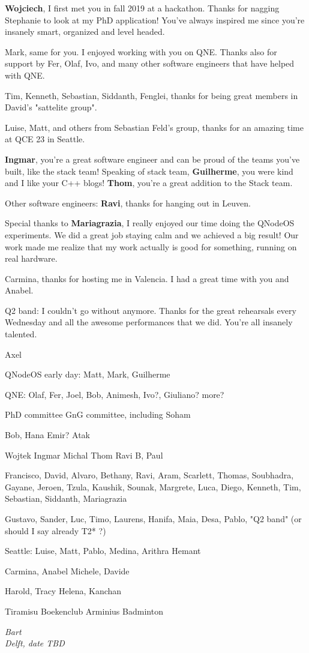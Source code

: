\textbf{Wojciech}, I first met you in fall 2019 at a hackathon. Thanks for nagging Stephanie to look at my PhD application! You've always inspired me since you're insanely smart, organized and level headed.


Mark, same for you. I enjoyed working with you on QNE. Thanks also for support by Fer, Olaf, Ivo, and many other software engineers that have helped with QNE.

Tim, Kenneth, Sebastian, Siddanth, Fenglei, thanks for being great members in David's "sattelite group".

Luise, Matt, and others from Sebastian Feld's group, thanks for an amazing time at QCE 23 in Seattle.


\textbf{Ingmar}, you're a great software engineer and can be proud of the teams you've built, like the stack team!
Speaking of stack team, \textbf{Guilherme}, you were kind and I like your C++ blogs!
\textbf{Thom}, you're a great addition to the Stack team.

Other software engineers: \textbf{Ravi}, thanks for hanging out in Leuven.

Special thanks to \textbf{Mariagrazia}, I really enjoyed our time doing the QNodeOS experiments. We did a great job staying calm and we achieved a big result! Our work made me realize that my work actually is good for something, running on real hardware.

Carmina, thanks for hosting me in Valencia. I had a great time with you and Anabel.

Q2 band: I couldn't go without anymore. Thanks for the great rehearsals every Wednesday and all the awesome performances that we did. You're all insanely talented.






Axel

QNodeOS early day: Matt, Mark, Guilherme

QNE: Olaf, Fer, Joel, Bob, Animesh, Ivo?, Giuliano? more?

PhD committee
GnG committee, including Soham

Bob, Hana
Emir?
Atak

Wojtek
Ingmar
Michal
Thom
Ravi B, Paul

Francisco, David, Alvaro, Bethany, Ravi, Aram, Scarlett, Thomas, Soubhadra, Gayane, Jeroen, Tzula, Kaushik, Sounak, Margrete, Luca, Diego, Kenneth, Tim, Sebastian, Siddanth, 
Mariagrazia

Gustavo, Sander, Luc, Timo, Laurens, Hanifa, Maia, Desa, Pablo, "Q2 band" (or should I say already T2* ?)

Seattle: Luise, Matt, Pablo, Medina, Arithra
Hemant

Carmina, Anabel
Michele, Davide

Harold, Tracy
Helena, Kanchan

Tiramisu
Boekenclub
Arminius
Badminton


\begin{flushright}
{\itshape
Bart \\
Delft, date TBD
}
\end{flushright}
